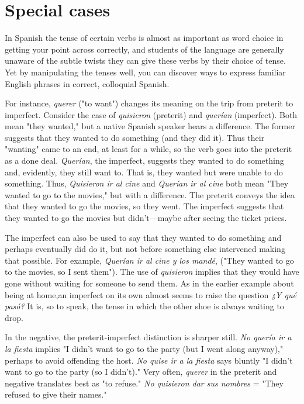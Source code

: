 \documentclass[14pt,a4paper,oneside]{memoir}
\begin{document}
\section{Special cases}

In Spanish the tense of certain verbs is almost as important as
word choice in getting your point across correctly, and students of the
language are generally unaware of the subtle twists they can give these
verbs by their choice of tense. Yet by manipulating the tenses well,
you can discover ways to express familiar English phrases in correct,
colloquial Spanish.

For instance, \emph{querer} ("to want") changes its meaning on the
trip from preterit to imperfect. Consider the case of \emph{quisieron} (preterit)
and \emph{querían} (imperfect). Both mean "they wanted," but a native Spanish speaker hears a difference. The former suggests that they wanted to
do something (and they did it). Thus their "wanting" came to an end,
at least for a while, so the verb goes into the preterit as a done deal.
\emph{Querían}, the imperfect, suggests they wanted to do something and,
evidently, they still want to. That is, they wanted but were unable to
do something. Thus, \emph{Quisieron ir al cine} and \emph{Querían ir al cine} both
mean "They wanted to go to the movies," but with a difference. The
preterit conveys the idea that they wanted to go the movies, so they
went. The imperfect suggests that they wanted to go the movies but
didn't---maybe after seeing the ticket prices.

The imperfect can also be used to say that they wanted to do
something and perhaps eventually did do it, but not before something
else intervened making that possible. For example, \emph{Querían ir al cine
y los mandé}, ("They wanted to go to the movies, so I sent them"). The
use of \emph{quisieron} implies that they would have gone without waiting
for someone to send them. As in the earlier example about being at
home,an imperfect on its own almost seems to raise the question \emph{¿Y
qué pasó?} It is, so to speak, the tense in which the other shoe is always
waiting to drop.

In the negative, the preterit-imperfect distinction is sharper
still. \emph{No quería ir a la fiesta} implies "I didn't want to go to the party
(but I went along anyway)," perhaps to avoid offending the host. \emph{No
quise ir a la fiesta} says bluntly "I didn't want to go to the party (so I
didn't)." Very often, \emph{querer} in the preterit and negative translates best
as "to refuse." \emph{No quisieron dar sus nombres} = "They refused to give
their names."
\end{document}
